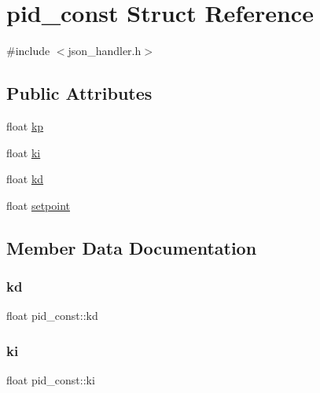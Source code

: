 \hypertarget{structpid__const}{}\section{pid\+\_\+const Struct Reference}
\label{structpid__const}


{\ttfamily \#include $<$json\+\_\+handler.\+h$>$}

\subsection*{Public Attributes}
\begin{DoxyCompactItemize}
\item 
float \hyperlink{structpid__const_a5ae3ec87567130989aa8dd833718c16a}{kp}
\item 
float \hyperlink{structpid__const_a29e400ad2fbe11cc68925c837956c1ab}{ki}
\item 
float \hyperlink{structpid__const_a5e6af6c51f63c03fe0fdf7705497e234}{kd}
\item 
float \hyperlink{structpid__const_a19b1118c03f705f3b693216e8f22d98a}{setpoint}
\end{DoxyCompactItemize}


\subsection{Member Data Documentation}
\mbox{\label{structpid__const_a5e6af6c51f63c03fe0fdf7705497e234}} 
\subsubsection{\texorpdfstring{kd}{kd}}
{\footnotesize\ttfamily float pid\+\_\+const\+::kd}

\mbox{\label{structpid__const_a29e400ad2fbe11cc68925c837956c1ab}} 
\subsubsection{\texorpdfstring{ki}{ki}}
{\footnotesize\ttfamily float pid\+\_\+const\+::ki}

\mbox{\label{structpid__const_a5ae3ec87567130989aa8dd833718c16a}} 
